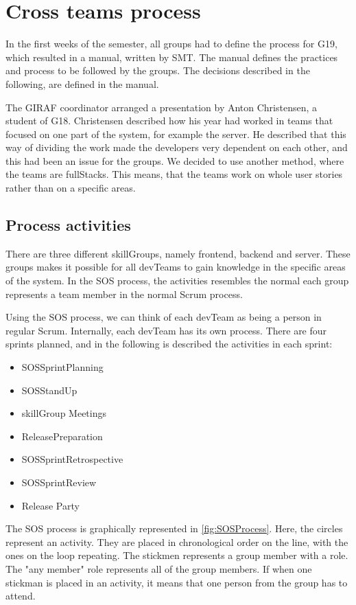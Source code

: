 \section{Cross teams process}
In the first weeks of the semester, all groups had to define the process for \gls{G19}, which resulted in a manual\cite{processManual}, written by \gls{SMT}.
The manual defines the practices and process to be followed by the groups. The decisions described in the following, are defined in the manual. 

The GIRAF coordinator arranged a presentation by Anton Christensen, a student of \gls{G18}.
Christensen described how his year had worked in teams that focused on one part of the system, for example the server. 
He described that this way of dividing the work made the developers very dependent on each other, and this had been an issue for the groups. 
We decided to use another method, where the teams are \Glspl{fullStack}. This means, that the teams work on whole user stories rather than on a specific areas. 

\subsection{Process activities}
There are three different \glspl{skillGroup}, namely frontend, backend and server. These groups makes it possible for all \glspl{devTeam} to gain knowledge in the specific areas of the system.
In the \gls{SOS} process, the activities resembles the normal each group represents a team member in the normal Scrum process.

Using the \gls{SOS} process, we can think of each \gls{devTeam} as being a person in regular Scrum. Internally, each \gls{devTeam} has its own process. 
There are four sprints planned, and in the following is described the activities in each sprint:

\begin{itemize}
    \item \Gls{SOSSprintPlanning}
    \item \Gls{SOSStandUp}
    \item \Gls{skillGroup} Meetings
    \item \Gls{ReleasePreparation}
    \item \Gls{SOSSprintRetrospective}
    \item \Gls{SOSSprintReview}
    \item Release Party
\end{itemize}

The SOS process is graphically represented in \autoref{fig:SOSProcess}. Here, the circles represent an activity. They are placed in chronological order on the line, with the ones on the loop repeating. The stickmen represents a group member with a role. The "any member" role represents all of the group members. If when one stickman is placed in an activity, it means that one person from the group has to attend. 

